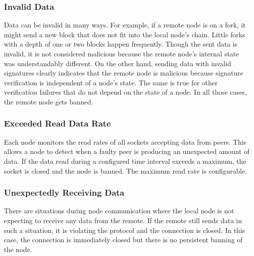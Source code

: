 \subsubsection*{Invalid Data}
Data can be invalid in many ways.
For example, if a remote node is on a fork, it might send a new block that does not fit into the local node's chain.
Little forks with a depth of one or two blocks happen frequently.
Though the sent data is invalid, it is not considered malicious because the remote node's internal state was understandably different.
On the other hand, sending data with invalid signatures clearly indicates that the remote node is malicious because signature verification is independent of a node's state.
The same is true for other verification failures that do not depend on the state of a node.
In all those cases, the remote node gets banned.

\subsubsection*{Exceeded Read Data Rate}
Each node monitors the read rates of all sockets accepting data from peers.
This allows a node to detect when a faulty peer is producing an unexpected amount of data.
If the data read during a configured time interval exceeds a maximum, the socket is closed and the node is banned.
The maximum read rate is configurable.

\subsubsection*{Unexpectedly Receiving Data}
There are situations during node communication where the local node is not expecting to receive any data from the remote.
If the remote still sends data in such a situation, it is violating the protocol and the connection is closed.
In this case, the connection is immediately closed but there is no persistent banning of the node.
